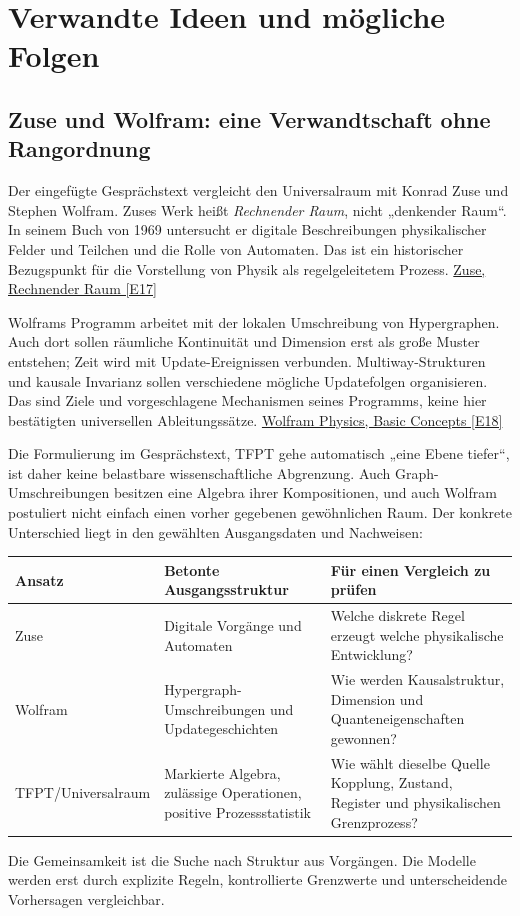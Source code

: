 \chapter{Verwandte Ideen und mögliche Folgen}
\section{Zuse und Wolfram: eine Verwandtschaft ohne Rangordnung}
Der eingefügte Gesprächstext vergleicht den Universalraum mit Konrad Zuse und Stephen Wolfram. Zuses Werk heißt \emph{Rechnender Raum}, nicht „denkender Raum“. In seinem Buch von 1969 untersucht er digitale Beschreibungen physikalischer Felder und Teilchen und die Rolle von Automaten. Das ist ein historischer Bezugspunkt für die Vorstellung von Physik als regelgeleitetem Prozess. \href{https://link.springer.com/book/10.1007/978-3-663-02723-2}{Zuse, Rechnender Raum [E17]}

Wolframs Programm arbeitet mit der lokalen Umschreibung von Hypergraphen. Auch dort sollen räumliche Kontinuität und Dimension erst als große Muster entstehen; Zeit wird mit Update-Ereignissen verbunden. Multiway-Strukturen und kausale Invarianz sollen verschiedene mögliche Updatefolgen organisieren. Das sind Ziele und vorgeschlagene Mechanismen seines Programms, keine hier bestätigten universellen Ableitungssätze. \href{https://www.wolframphysics.org/technical-introduction/potential-relation-to-physics/basic-concepts/}{Wolfram Physics, Basic Concepts [E18]}

Die Formulierung im Gesprächstext, TFPT gehe automatisch „eine Ebene tiefer“, ist daher keine belastbare wissenschaftliche Abgrenzung. Auch Graph-Umschreibungen besitzen eine Algebra ihrer Kompositionen, und auch Wolfram postuliert nicht einfach einen vorher gegebenen gewöhnlichen Raum. Der konkrete Unterschied liegt in den gewählten Ausgangsdaten und Nachweisen:
\par\noindent\begin{tabularx}{\linewidth}{L{26mm}Y Y}
\toprule \textbf{Ansatz}&\textbf{Betonte Ausgangsstruktur}&\textbf{Für einen Vergleich zu prüfen}\\\midrule
Zuse&Digitale Vorgänge und Automaten&Welche diskrete Regel erzeugt welche physikalische Entwicklung?\\
Wolfram&Hypergraph-Umschreibungen und Updategeschichten&Wie werden Kausalstruktur, Dimension und Quanteneigenschaften gewonnen?\\
TFPT/Universalraum&Markierte Algebra, zulässige Operationen, positive Prozessstatistik&Wie wählt dieselbe Quelle Kopplung, Zustand, Register und physikalischen Grenzprozess?\\\bottomrule
\end{tabularx}\par
Die Gemeinsamkeit ist die Suche nach Struktur aus Vorgängen. Die Modelle werden erst durch explizite Regeln, kontrollierte Grenzwerte und unterscheidende Vorhersagen vergleichbar.

